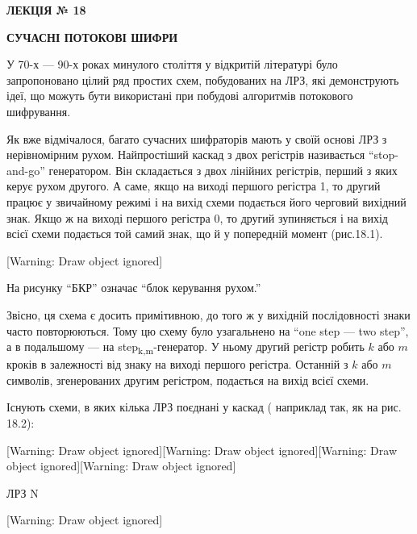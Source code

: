 {{{{\bigskip


\bigskip


\bigskip

{\bfseries
ЛЕКЦІЯ № 18}


\bigskip

{\centering\bfseries
СУЧАСНІ  ПОТОКОВІ  ШИФРИ
\par}


\bigskip


\bigskip

У 70-х --- 90-х роках минулого століття у відкритій літературі було запропоновано
цілий ряд простих схем, побудованих на ЛРЗ, які демонструють ідеї, що можуть
бути використані при побудові алгоритмів потокового шифрування.

Як вже відмічалося, багато сучасних шифраторів мають у своїй основі ЛРЗ з
нерівномірним рухом. Найпростіший каскад з двох регістрів називається
“stop{}-and{}-go'' генератором. Він складається з двох лінійних регістрів,
перший з яких керує рухом другого. А саме, якщо на виході першого регістра 1,
то другий працює у звичайному режимі і на вихід схеми подається його черговий
вихідний знак. Якщо ж на виході першого регістра 0, то другий зупиняється і на
вихід всієї схеми  подається той самий знак, що й у попередній момент
(рис.18.1).

[Warning: Draw object ignored]

На рисунку “БКР'' означає “блок керування рухом.''

Звісно, ця схема є досить примітивною, до того ж у вихідній послідовності знаки
часто повторюються. Тому цю схему було узагальнено на “one step --- two step'', а
в подальшому --- на 
step\textsubscript{k}\textsubscript{,}\textsubscript{m}{}-генератор. У ньому
другий регістр робить  $k$ або  $m$ кроків в залежності від знаку на виході
першого регістра. Останній з  $k$ або  $m$ символів, згенерованих другим
регістром, подається на вихід всієї схеми.

Існують схеми, в яких кілька ЛРЗ поєднані у каскад ( наприклад так, як на рис.
18.2):


\bigskip

[Warning: Draw object ignored][Warning: Draw object ignored][Warning: Draw
object ignored][Warning: Draw object ignored]\begin{minipage}{1.0098in}

\bigskip
\end{minipage}\begin{minipage}{1.0091in}
 ЛРЗ N
\end{minipage}[Warning: Draw object ignored]

}}}}

